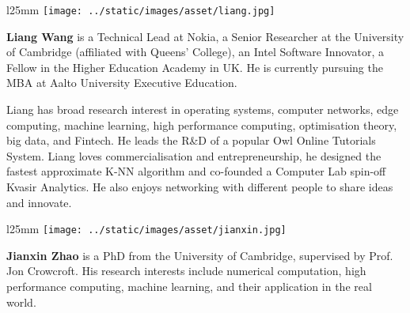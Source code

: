 \begin{wrapfigure}{l}{25mm} 
    \texttt{[image: ../static/images/asset/liang.jpg]}
\end{wrapfigure}\par
\textbf{Liang Wang} is a Technical Lead at Nokia, a Senior Researcher at the University of Cambridge (affiliated with Queens' College), an Intel Software Innovator, a Fellow in the Higher Education Academy in UK. He is currently pursuing the MBA at Aalto University Executive Education. 

Liang has broad research interest in operating systems, computer networks, edge computing, machine learning, high performance computing, optimisation theory, big data, and Fintech. He leads the R\&D of a popular Owl Online Tutorials System. Liang loves commercialisation and entrepreneurship, he designed the fastest approximate K-NN algorithm and co-founded a Computer Lab spin-off Kvasir Analytics. He also enjoys networking with different people to share ideas and innovate.\par

\vspace{3cm}

\begin{wrapfigure}{l}{25mm} 
    \vspace{-4mm}
    \texttt{[image: ../static/images/asset/jianxin.jpg]}
\end{wrapfigure}\par
\textbf{Jianxin Zhao} is a PhD from the University of Cambridge, supervised by Prof. Jon Crowcroft. His research interests include numerical computation, high performance computing, machine learning, and their application in the real world.\par


\clearpage